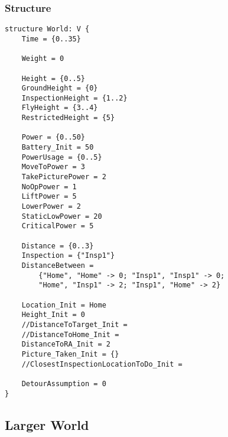\documentclass[12pt]{extarticle}
\begin{document}
\subsubsection*{Structure}
\begin{lstlisting}[basicstyle=\tiny]
structure World: V {
    Time = {0..35}
    
    Weight = 0
    
    Height = {0..5}
    GroundHeight = {0}
    InspectionHeight = {1..2}
    FlyHeight = {3..4}
    RestrictedHeight = {5}
    
    Power = {0..50}
    Battery_Init = 50
    PowerUsage = {0..5}
    MoveToPower = 3
    TakePicturePower = 2
    NoOpPower = 1
    LiftPower = 5
    LowerPower = 2
    StaticLowPower = 20
    CriticalPower = 5
    
    Distance = {0..3}
    Inspection = {"Insp1"}
    DistanceBetween =
    	{"Home", "Home" -> 0; "Insp1", "Insp1" -> 0;
    	"Home", "Insp1" -> 2; "Insp1", "Home" -> 2}
    
    Location_Init = Home
    Height_Init = 0
    //DistanceToTarget_Init =
    //DistanceToHome_Init =
    DistanceToRA_Init = 2
    Picture_Taken_Init = {}
    //ClosestInspectionLocationToDo_Init =
    
    DetourAssumption = 0
}
\end{lstlisting}

\subsection{Larger World}
\label{app:afvsid-large}
\end{document}
